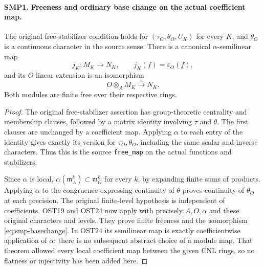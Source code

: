 \documentclass[11pt,a4paper]{article}
\numberwithin{equation}{section}
\theoremstyle{remark}\newtheorem{remark}[theorem]{Remark}
\begin{document}
\paragraph{SMP1. Freeness and ordinary base change on the actual coefficient map.}
\label{claim:SMP1}
The original free-stabilizer condition holds for
$(\tau_O,\theta_O,\allowbreak{} U_K)$ for every $K$, and
$\theta_O$ is a continuous character in the source sense.
There is a canonical $\alpha$-semilinear map
\[
               j_K:M_K\longrightarrow N_K,
                        \qquad j_K(f)=\varepsilon_O(f),
\]
and its $O$-linear extension is an isomorphism
\begin{equation}\label{eq:smp-basechange}
                  O\otimes_A M_K\xrightarrow{\sim}N_K.
\end{equation}
Both modules are finite free over their respective rings.
\begin{proof}
The original free-stabilizer assertion has group-theoretic
centrality and membership clauses, followed by a matrix
identity involving $\tau$ and $\theta$.  The first clauses
are unchanged by a coefficient map.  Applying $\alpha$
to each entry of the identity gives exactly its version
for $\tau_O,\theta_O$, including the same scalar and
inverse characters.  Thus this is the source
\texttt{free\_\allowbreak map} on the actual functions and stabilizers.

Since $\alpha$ is local,
$\alpha(\mathfrak m_A^k)\subset\mathfrak m_O^k$ for
every $k$, by expanding finite sums of products.  Applying
$\alpha$ to the congruence expressing continuity of
$\theta$ proves continuity of $\theta_O$ at each precision.
The original finite-level hypothesis is independent of
coefficients.  OST19 and OST24 now apply with precisely
$A,\allowbreak{} O,\alpha$ and these original characters and levels.
They prove finite freeness and the isomorphism
\eqref{eq:smp-basechange}.  In OST24 its semilinear map
is exactly coefficientwise application of $\alpha$;
there is no subsequent abstract choice of a module map.
That theorem allowed every local coefficient map between
the given CNL rings, so no flatness or injectivity has
been added here.
\end{proof}

\end{document}
